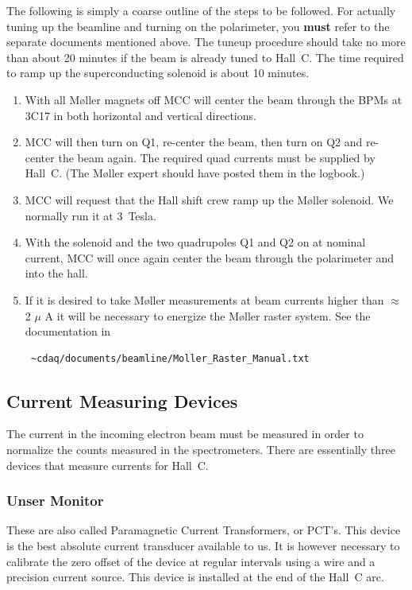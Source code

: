 The following is simply a coarse outline of the steps to be followed.
For actually tuning up the beamline and turning on the polarimeter, you {\bf must}
refer to the separate documents mentioned above. The tuneup procedure should take no
more than about 20 minutes if the beam is already tuned to Hall~C.
The time required to ramp up the superconducting solenoid is about 10 minutes.
\begin{enumerate}
        \item With all M\o ller magnets off MCC will
           center  the beam through the BPMs at 3C17  in both
           horizontal  and vertical  directions. 

        \item MCC will then turn on Q1, re-center the beam, then turn
	on Q2 and re-center the beam again. The required quad currents
	must be supplied by Hall~C.  (The M\o ller expert should have
	posted them in the logbook.)

        \item MCC will request that the Hall shift crew ramp up the
	M\o ller solenoid. We normally run it at 3~Tesla.

        \item With the solenoid and the two quadrupoles Q1 and Q2 on
              at nominal current, MCC will once again center the beam
              through the polarimeter and into the hall.

	\item If it is desired to take M\o ller measurements at beam currents
	      higher than $\approx$ 2 $\mu$ A it will be necessary to energize
	      the M\o ller raster system. See the documentation in
              \begin{verbatim} ~cdaq/documents/beamline/Moller_Raster_Manual.txt \end{verbatim}
\end{enumerate}


\subsection{Current Measuring Devices}

The current in the incoming electron beam must be measured in order to
normalize the counts measured in the spectrometers. There are essentially
three devices that measure currents for Hall~C.

\subsubsection{Unser Monitor}  These are also called Paramagnetic Current Transformers,
or PCT's. This device is the best absolute current transducer available to us.
It is however necessary to calibrate the zero offset of the device at
regular intervals using a wire and a precision current source. This device
is installed at the end of the Hall~C arc.
